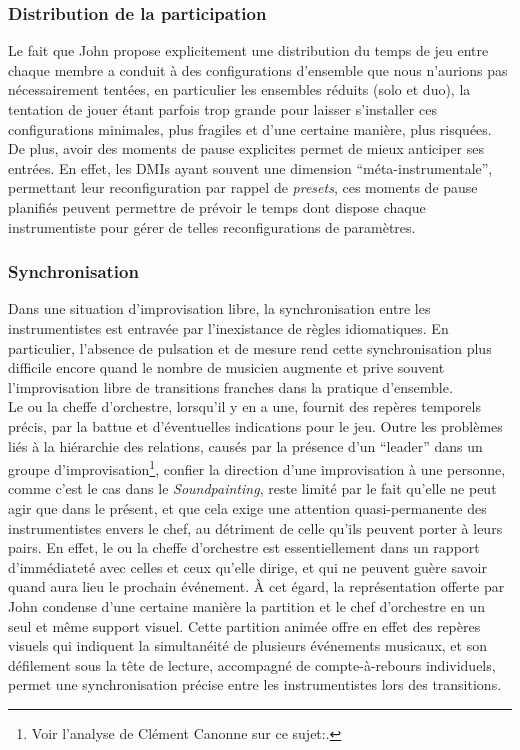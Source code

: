 \subsubsection{Distribution de la participation}

\noindent Le fait que John propose explicitement une distribution du temps de jeu entre chaque membre a conduit à des configurations d'ensemble que nous n'aurions pas nécessairement tentées, en particulier les ensembles réduits (solo et duo), la tentation de jouer étant parfois trop grande pour laisser s'installer ces configurations minimales, plus fragiles et d'une certaine manière, plus risquées.\\
\indent De plus, avoir des moments de pause explicites permet de mieux anticiper ses entrées. En effet, les \glspl{DMI} ayant souvent une dimension ``méta-instrumentale'', permettant leur reconfiguration par rappel de \textit{presets}, ces moments de pause planifiés peuvent permettre de prévoir le temps dont dispose chaque instrumentiste pour gérer de telles reconfigurations de paramètres.

\subsubsection{Synchronisation}

\noindent Dans une situation d'improvisation libre, la synchronisation entre les instrumentistes est entravée par l'inexistance de règles idiomatiques. En particulier, l'absence de pulsation et de mesure rend cette synchronisation plus difficile encore quand le nombre de musicien augmente et prive souvent l'improvisation libre de transitions franches dans la pratique d'ensemble.\\
\indent Le ou la cheffe d'orchestre, lorsqu'il y en a une, fournit des repères temporels précis, par la battue et d'éventuelles indications pour le jeu. Outre les problèmes liés à la hiérarchie des relations, causés par la présence d'un ``leader'' dans un groupe d'improvisation\footnote{Voir l'analyse de Clément Canonne sur ce sujet:\cite{canonne_improvisation_2012}.}, confier la direction d'une improvisation à une personne, comme c'est le cas dans le \textit{Soundpainting}, reste limité par le fait qu'elle ne peut agir que dans le présent, et que cela exige une attention quasi-permanente des instrumentistes envers le chef, au détriment de celle qu'ils peuvent porter à leurs pairs. En effet, le ou la cheffe d'orchestre est essentiellement dans un rapport d'immédiateté avec celles et ceux qu'elle dirige, et qui ne peuvent guère savoir quand aura lieu le prochain événement. À cet égard, la représentation offerte par John condense d'une certaine manière la partition et le chef d'orchestre en un seul et même support visuel. Cette partition animée offre en effet des repères visuels qui indiquent la simultanéité de plusieurs événements musicaux, et son défilement sous la tête de lecture, accompagné de compte-à-rebours individuels, permet une synchronisation précise entre les instrumentistes lors des transitions.

